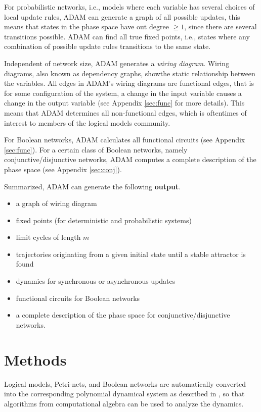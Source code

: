 \documentclass[11pt]{amsart}
\begin{document}
For probabilistic networks, i.e., models where each variable has several choices of local update rules, ADAM can generate a graph of all possible updates, this means that states in the phase space have out degree $\geq 1$, since there are several transitions possible. ADAM can find all true fixed points, i.e., states where any combination of possible update rules transitions to the same state. 
 
Independent of network size, ADAM generates a {\it wiring diagram}. Wiring diagrams, also known as dependency graphs, showthe static relationship between the variables. All edges in ADAM’s wiring diagrams are functional edges, that is for some configuration of the system, a change in the input variable causes a change in the output variable (see Appendix \ref{sec:func} for more details). This means that ADAM determines all non-functional edges, which is oftentimes of interest to members of the logical models community.
 
For Boolean networks, ADAM calculates all functional circuits (see Appendix \ref{sec:func}). For a certain class of Boolean networks, namely conjunctive/disjunctive networks, ADAM computes a complete description of the phase space (see Appendix \ref{sec:conj}). 
 
Summarized, ADAM can generate the following {\bf output}.
\begin{itemize}
 \item a graph of wiring diagram
 \item fixed points (for deterministic and probabilistic systems)
 \item limit cycles of length $m$
 \item trajectories originating from a given initial state until a stable
 attractor is found
 \item dynamics for synchronous or asynchronous updates
 \item functional circuits for Boolean networks
 \item a complete description of the phase space for conjunctive/disjunctive
 networks.
\end{itemize}
 
\section{Methods}
Logical models, Petri-nets, and Boolean networks are automatically converted
into the corresponding polynomial dynamical system as described in
\cite{Alan:Bioinf2010}, so that algorithms from computational
algebra can be used to analyze the dynamics.
 
\end{document}
